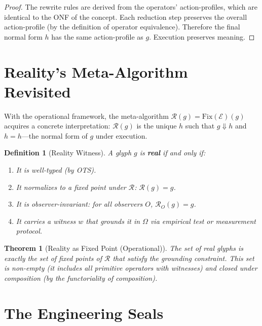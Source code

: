 \documentclass[12pt, letterpaper]{book}
\def\equiv{=}%
\def\mathfrak#1{#1}%
\newtheorem{theorem}{Theorem}[chapter]
\newtheorem{definition}{Definition}[chapter]
\begin{document}
\begin{proof}
The rewrite rules are derived from the operators' action-profiles, which are identical to the ONF of the concept. Each reduction step preserves the overall action-profile (by the definition of operator equivalence). Therefore the final normal form $\mathfrak{h}$ has the same action-profile as $\mathfrak{g}$. Execution preserves meaning.
\end{proof}

\section{Reality's Meta-Algorithm Revisited}

With the operational framework, the meta-algorithm $\mathcal{R}(\mathfrak{g}) = \mathrm{Fix}(\mathcal{E})(\mathfrak{g})$ acquires a concrete interpretation: $\mathcal{R}(\mathfrak{g})$ is the unique $\mathfrak{h}$ such that $\mathfrak{g} \Downarrow \mathfrak{h}$ and $\mathfrak{h} \equiv \mathfrak{h}$---the normal form of $\mathfrak{g}$ under execution.

\begin{definition}[Reality Witness]\label{def:reality-witness}
A glyph $\mathfrak{g}$ is \textbf{real} if and only if:
\begin{enumerate}[label=(\roman*)]
    \item It is well-typed (by OTS).
    \item It normalizes to a fixed point under $\mathcal{R}$: $\mathcal{R}(\mathfrak{g}) = \mathfrak{g}$.
    \item It is observer-invariant: for all observers $O$, $\mathcal{R}_O(\mathfrak{g}) = \mathfrak{g}$.
    \item It carries a witness $w$ that grounds it in $\Omega$ via empirical test or measurement protocol.
\end{enumerate}
\end{definition}

\begin{theorem}[Reality as Fixed Point (Operational)]\label{thm:reality-op}
The set of real glyphs is exactly the set of fixed points of $\mathcal{R}$ that satisfy the grounding constraint. This set is non-empty (it includes all primitive operators with witnesses) and closed under composition (by the functoriality of composition).
\end{theorem}

\section{The Engineering Seals}
\end{document}
